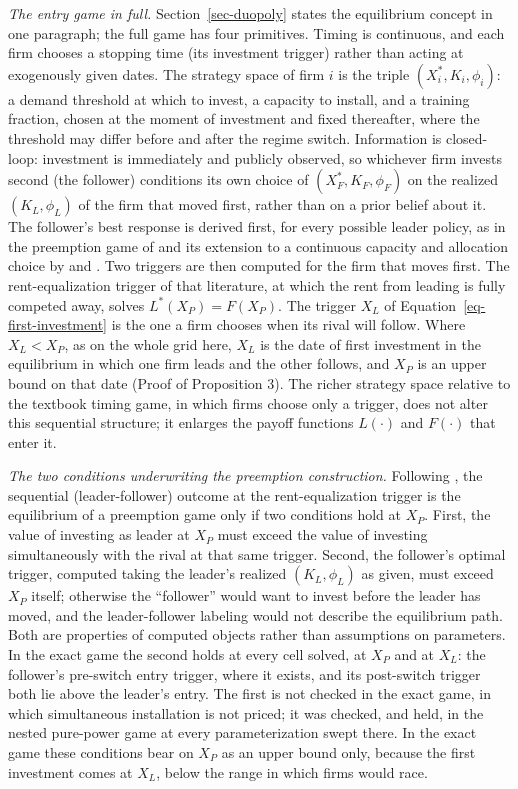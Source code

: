 \documentclass[
  11pt,
  letterpaper,
]{scrartcl}
\begin{document}
\emph{The entry game in full.} Section~\ref{sec-duopoly} states the
equilibrium concept in one paragraph; the full game has four primitives.
Timing is continuous, and each firm chooses a stopping time (its
investment trigger) rather than acting at exogenously given dates. The
strategy space of firm \(i\) is the triple \((X_i^*, K_i, \phi_i)\): a
demand threshold at which to invest, a capacity to install, and a
training fraction, chosen at the moment of investment and fixed
thereafter, where the threshold may differ before and after the regime
switch. Information is closed-loop: investment is immediately and
publicly observed, so whichever firm invests second (the follower)
conditions its own choice of \((X_F^*, K_F, \phi_F)\) on the realized
\((K_L, \phi_L)\) of the firm that moved first, rather than on a prior
belief about it. The follower's best response is derived first, for
every possible leader policy, as in the preemption game of
\citet{fudenberg1985preemption} and its extension to a continuous
capacity and allocation choice by \citet{huisman2015strategic} and
\citet{pawlina2006real}. Two triggers are then computed for the firm
that moves first. The rent-equalization trigger of that literature, at
which the rent from leading is fully competed away, solves
\(L^*(X_P) = F(X_P)\). The trigger \(X_L\) of
Equation~\ref{eq-first-investment} is the one a firm chooses when its
rival will follow. Where \(X_L < X_P\), as on the whole grid here,
\(X_L\) is the date of first investment in the equilibrium in which one
firm leads and the other follows, and \(X_P\) is an upper bound on that
date (Proof of Proposition 3). The richer strategy space relative to the
textbook timing game, in which firms choose only a trigger, does not
alter this sequential structure; it enlarges the payoff functions
\(L(\cdot)\) and \(F(\cdot)\) that enter it.

\emph{The two conditions underwriting the preemption construction.}
Following \citet{huisman2015strategic}, the sequential (leader-follower)
outcome at the rent-equalization trigger is the equilibrium of a
preemption game only if two conditions hold at \(X_P\). First, the value
of investing as leader at \(X_P\) must exceed the value of investing
simultaneously with the rival at that same trigger. Second, the
follower's optimal trigger, computed taking the leader's realized
\((K_L, \phi_L)\) as given, must exceed \(X_P\) itself; otherwise the
``follower'' would want to invest before the leader has moved, and the
leader-follower labeling would not describe the equilibrium path. Both
are properties of computed objects rather than assumptions on
parameters. In the exact game the second holds at every cell solved, at
\(X_P\) and at \(X_L\): the follower's pre-switch entry trigger, where
it exists, and its post-switch trigger both lie above the leader's
entry. The first is not checked in the exact game, in which simultaneous
installation is not priced; it was checked, and held, in the nested
pure-power game at every parameterization swept there. In the exact game
these conditions bear on \(X_P\) as an upper bound only, because the
first investment comes at \(X_L\), below the range in which firms would
race.
\end{document}
